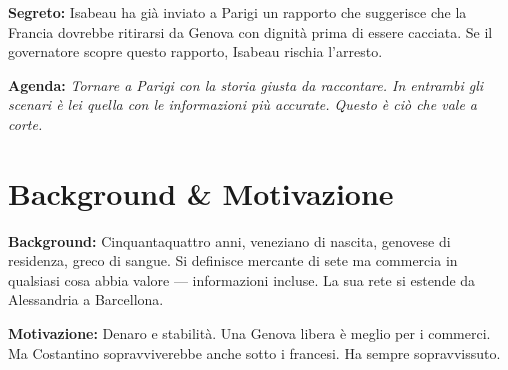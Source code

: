 \clearpage
\begin{secretbox}
\textbf{Segreto:} Isabeau ha gi\`a inviato a Parigi un rapporto che suggerisce che la Francia dovrebbe ritirarsi da Genova con dignit\`a prima di essere cacciata. Se il governatore scopre questo rapporto, Isabeau rischia l'arresto.

\medskip\noindent\textcolor{SecretRed}{\textbf{Agenda:}} \textit{Tornare a Parigi con la storia giusta da raccontare. In entrambi gli scenari \`e lei quella con le informazioni pi\`u accurate. Questo \`e ci\`o che vale a corte.}
\end{secretbox}

\clearpage



\section*{Background \& Motivazione}
\begin{rulebox}{}
\textbf{Background:} Cinquantaquattro anni, veneziano di nascita, genovese di residenza, greco di sangue. Si definisce mercante di sete ma commercia in qualsiasi cosa abbia valore --- informazioni incluse. La sua rete si estende da Alessandria a Barcellona.

\medskip\noindent\textcolor{GrimaldiPurple}{\textbf{Motivazione:}} Denaro e stabilit\`a. Una Genova libera \`e meglio per i commerci. Ma Costantino sopravviverebbe anche sotto i francesi. Ha sempre sopravvissuto.
\end{rulebox}

